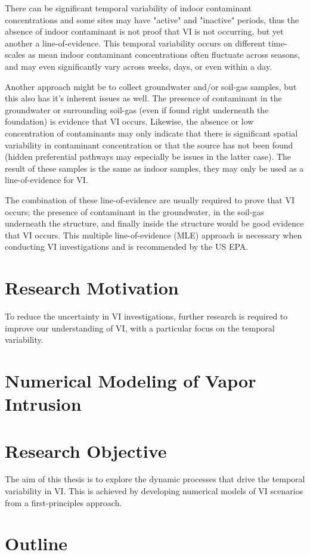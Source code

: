 \documentclass[../thesis.tex]{subfiles}
\begin{document}
There can be significant temporal variability of indoor contaminant concentrations and some sites may have "active" and "inactive" periods, thus the absence of indoor contaminant is not proof that VI is not occurring, but yet another a line-of-evidence.
This temporal variability occurs on different time-scales as mean indoor contaminant concentrations often fluctuate across seasons, and may even significantly vary across weeks, days, or even within a day.

Another approach might be to collect groundwater and/or soil-gas samples, but this also has it's inherent issues as well.
The presence of contaminant in the groundwater or surrounding soil-gas (even if found right underneath the foundation) is evidence that VI occurs.
Likewise, the absence or low concentration of contaminants may only indicate that there is significant spatial variability in contaminant concentration or that the source has not been found (hidden preferential pathways may especially be issues in the latter case).
The result of these samples is the same as indoor samples, they may only be used as a line-of-evidence for VI.

The combination of these line-of-evidence are usually required to prove that VI occurs; the presence of contaminant in the groundwater, in the soil-gas underneath the structure, and finally inside the structure would be good evidence that VI occurs.
This multiple line-of-evidence (MLE) approach is necessary when conducting VI investigations and is recommended by the US EPA.

\section{Research Motivation}

To reduce the uncertainty in VI investigations, further research is required to improve our understanding of VI, with a particular focus on the temporal variability.

\section{Numerical Modeling of Vapor Intrusion}

\section{Research Objective}

The aim of this thesis is to explore the dynamic processes that drive the temporal variability in VI.
This is achieved by developing numerical models of VI scenarios from a first-principles approach.

\section{Outline}
\end{document}
